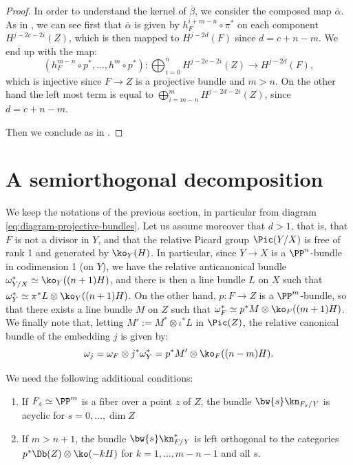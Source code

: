 \begin{proof}
In order to understand the kernel of $\overline{\beta}$, we consider the composed map $\overline{\alpha}$.
As in \cite[7.3.3]{voisin-book}, we
can see first that $\overline{\alpha}$ is given by $h_F^{i+m-n}\circ \pi^*$ on each component $H^{j-2c-2i}(Z)$,
which is then mapped to $H^{j-2d}(F)$ since $d=c+n-m$.
We end up with the map:
\[
(h_F^{m-n}\circ p^*,\ldots,h^m \circ p^*): \bigoplus_{i=0}^n H^{j-2c-2i}(Z) \to H^{j-2d}(F),
\]
which is injective since $F \to Z$ is a projective bundle and $m > n$. On the other hand the left most term is equal to $\bigoplus_{i=m-n}^m H^{j-2d-2i}(Z)$, since $d=c+n-m$.

Then we conclude as in \cite[7.3.3]{voisin-book}.
\end{proof}

\section{A semiorthogonal decomposition}\label{sect:appendix-A}

We keep the notations of the previous section, in particular from diagram \eqref{eq:diagram-projective-bundles}.
Let us assume moreover that $d>1$, that is, that $F$ is not a divisor in $Y$, and that the relative Picard
group $\Pic(Y/X)$ is free of rank 1 and generated by $\ko_Y(H)$. In particular, since $Y \to X$ is a $\PP^n$-bundle
in codimension 1 (on $Y$), we have the relative anticanonical bundle $\omega^*_{Y/X} \simeq \ko_Y((n+1)H)$,
and there is then a line bundle $L$ on $X$ such that $\omega^*_Y \simeq \pi^* L\otimes \ko_Y((n+1)H)$.
On the other hand, $p: F \to Z$ is a $\PP^m$-bundle, so that there exists a line bundle $M$ on $Z$
such that $\omega_F^* \simeq p^* M \otimes \ko_F((m+1)H)$. We finally note that, letting $M':=M^* \otimes \iota^* L$ in $\Pic(Z)$,
the relative canonical bundle of the embedding $j$ is given by:
\[
\omega_j = \omega_F \otimes j^*\omega_Y^* = p^*M' \otimes \ko_F((n-m)H).
\]

We need the following additional conditions:

\begin{enumerate}\renewcommand{\theenumi}{C\arabic{enumi}}
\item\label{C1}
If $F_z \simeq \PP^m$ is a fiber over a point $z$ of $Z$,
the bundle $\bw{s} \kn_{F_z/Y}$ is acyclic for $s=0,\ldots,\dim Z$
\item\label{C2}
If $m > n+1$, the bundle $\bw{s} \kn^*_{F/Y}$ is left orthogonal to the categories
$p^* \Db(Z) \otimes \ko(-kH)$ for $k=1,\ldots,m-n-1$ and all $s$.
\end{enumerate}

